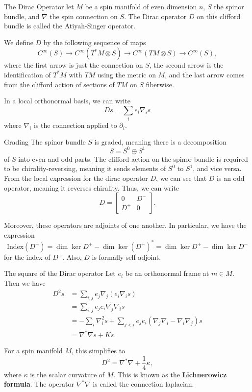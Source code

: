 \documentclass[11pt, reqno]{beamer}
\begin{document}
\begin{frame}{The Dirac Operator}
    let $M$ be a spin manifold of even dimension $n$, $S$ the spinor bundle, and $\nabla$ the 
    spin connection on $S$. The Dirac operator $D$ on this clifford bundle is called the Atiyah-Singer operator.

    \begin{definition}
        We define $D$ by the following sequence of maps 
        \[
            C^\infty(S) \to C^\infty(T^*M \otimes S) \to C^\infty(TM\otimes S) \to C^\infty(S),
        \]
        where the first arrow is just the connection on $S$, the second arrow is the identification of $T^*M$
        with $TM$ using the metric on $M$, and the last arrow comes from the clifford action of sections of $TM$
        on $S$ fiberwise. 
    \end{definition}

    In a local orthonormal basis, we can write
    \[
        Ds = \sum_i e_i \nabla_i s
    \]
    where $\nabla_i$ is the connection applied to $\partial_i$. 
\end{frame}

\begin{frame}{Grading}
    The spinor bundle $S$ is graded, meaning there is a decomposition
    \[
        S = S^0 \oplus S^1
    \]
    of $S$ into even and odd parts. The clifford action on the spinor bundle is required to be 
    chirality-reversing, meaning it sends elements of $S^0$ to $S^1$, and vice versa. From
    the local expression for the dirac operator $D$, we can see that $D$ is an odd operator, 
    meaning it reverses chirality. Thus, we can write
    \[
        D = \begin{bmatrix}
            0 & D^-\\
            D^+ & 0
        \end{bmatrix}.
    \]

    Moreover, these operators are adjoints of one another. In particular, we have the expression
    \[
        \text{Index}(D^+) = \dim\ker D^+ - \dim \ker (D^+)^* = \dim\ker D^+ - \dim\ker D^-
    \]
    for the index of $D^+$. Also, $D$ is formally self adjoint.
\end{frame}

\begin{frame}
    The square of the Dirac operator 
    Let $e_i$ be an orthonormal frame at $m \in M$. Then we have
    \begin{align}
        D^2s & = \sum_{i,j}e_j \nabla_j(e_i \nabla_i s)\\
        & = \sum_{i,j}e_j e_i \nabla_j \nabla_i s\\
        & = -\sum_i \nabla_i^2 s + \sum_{j < i} e_j e_i (\nabla_j \nabla_i - \nabla_i \nabla_j)s\\
        & = \nabla^*\nabla s + Ks.
    \end{align}
    
    For a spin manifold $M$, this simplifies to
    \[
        D^2 = \nabla^*\nabla + \frac{1}{4}\kappa,
    \]
    where $\kappa$ is the scalar curvature of $M$. This is known as the \textbf{Lichnerowicz formula}.
    The operator $\nabla^* \nabla$ is called the connection laplacian.
\end{frame}
\end{document}
